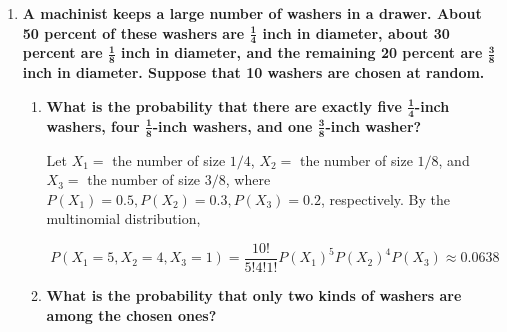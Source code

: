 \documentclass[10pt, oneside]{article}
\begin{document}
\begin{enumerate}[label=8.\arabic*]
\begin{enumerate}
	We can immediately see that there are $\binom{4}{2} = 6$ unique ways we can choose exactly two components of the four to be functioning. Therefore the probability we are trying to calculate will have six terms, namely
	
	\begin{align*}
	P(\text{exactly 2 components are functioning}) &= (1-p_1)(1-p_2) p_3 p_4 + (1-p_1) p_2 (1-p_3) p_4 + (1-p_1) p_2 p_3 (1-p_4) \\
	&\quad \quad + p_1 (1-p_2) (1-p_3) p_4 + p_1 (1-p_2) p_3 (1-p_4) + p_1 p_2 (1-p_3) (1 - p_4) \\
	&\approx \boxed{0.0964}
	\end{align*}
	
	
	\end{enumerate}

\item  \begin{tcolorbox}[
  colback=Cerulean!5!white,
  colframe=Cerulean!75!black]
\textbf{A machinist keeps a large number of washers in a drawer. About 50 percent of these washers are $\bm{\frac{1}{4}}$ inch in diameter, about 30 percent are $\bm{\frac{1}{8}}$ inch in diameter, and the remaining 20 percent are $\bm{\frac{3}{8}}$ inch in diameter. Suppose that 10 washers are chosen at random.}
\end{tcolorbox}

	\begin{enumerate}
	\item  \begin{tcolorbox}[
	  colback=Cerulean!5!white,
	  colframe=Cerulean!75!black]
	\textbf{What is the probability that there are exactly five $\bm{\frac{1}{4}}$-inch washers, four $\bm{\frac{1}{8}}$-inch washers, and one $\bm{\frac{3}{8}}$-inch washer?}
	\end{tcolorbox}
	
	Let $X_1 = $ the number of size $1/4$, $X_2 =$ the number of size $1/8$, and $X_3 =$ the number of size $3/8$, where $P(X_1) = 0.5, P(X_2) = 0.3, P(X_3) = 0.2$, respectively. By the multinomial distribution,
	
	\[ P(X_1 = 5, X_2 = 4, X_3 = 1) = \frac{10!}{5! 4! 1!} P(X_1)^5 P(X_2)^4 P(X_3) \approx \boxed{0.0638} \]
	
	\item  \begin{tcolorbox}[
	  colback=Cerulean!5!white,
	  colframe=Cerulean!75!black]
	\textbf{What is the probability that only two kinds of washers are among the chosen ones?}
	\end{tcolorbox}
	

\end{enumerate}
\end{enumerate}
\end{document}

